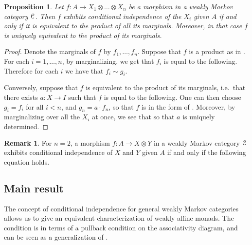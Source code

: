 \documentclass[a4paper,UKenglish,numberwithinsect,cleveref, autoref, thm-restate]{lipics-v2021}
\theoremstyle{plain} %
\newtheorem{myproposition}[mytheorem]{Proposition}
\theoremstyle{definition} %
\newtheorem{myremark}[mytheorem]{Remark}
\begin{document}
\begin{myproposition}\label{eqcondind}
 Let $f:A\to X_1\otimes\dots\otimes X_n$ be a morphism in a weakly Markov category $\mathcal{C}$. Then $f$ exhibits conditional independence of the $X_i$ given $A$ if and only if it is equivalent to the product of all its marginals.
 Moreover, in that case $f$ is \emph{uniquely} equivalent to the product of its marginals.
\end{myproposition}

\begin{proof}
 Denote the marginals of $f$ by $f_1,\dots,f_n$.
 Suppose that $f$ is a product as in . For each $i=1,\dots,n$, by marginalizing, we get that $f_i$ is equal to the following.
 Therefore for each $i$ we have that $f_i\sim g_i$. 
 
 Conversely, suppose that $f$ is equivalent to the product of its marginals, i.e.~that there exists $a:X\to I$ such that $f$ is equal to the following.
 One can then choose $g_i=f_i$ for all $i<n$, and $g_n = a\cdot f_n$, so that $f$ is in the form of .
 Moreover, by marginalizing over all the $X_i$ at once, we see that 
 so that $a$ is uniquely determined.
\end{proof} 
 
\begin{myremark}
 For $n=2$, a morphism $f:A\to X\otimes Y$ in a weakly Markov category $\mathcal{C}$ exhibits conditional independence of $X$ and $Y$ given $A$ 
 if and only if the following equation holds.
\end{myremark}


\subsection{Main result}

The concept of conditional independence for general weakly Markov categories allows us to give an equivalent characterization of weakly affine monads.
The condition is in terms of a pullback condition on the associativity diagram, and can be seen as a generalization of .
\end{document}
